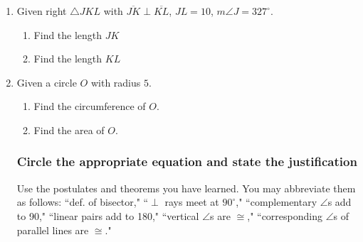 \documentclass[12pt, twoside]{article}
\begin{document}
\begin{enumerate}
  \item Given right $\triangle JKL$ with $\overline{JK} \perp \overline{KL}$, $JL=10$, $m\angle J=327^\circ$.
    \begin{center}
       \vspace{1cm}
    \end{center}
    \begin{enumerate}
      \item Find the length $JK$\\[2cm]
      \item Find the length $KL$\\[2cm]
    \end{enumerate}

  \item Given a circle $O$ with radius $5$.
  \begin{enumerate}
    \item Find the circumference of $O$. \vspace{2cm}
    \item Find the area of $O$. \vspace{2cm}
  \end{enumerate}

\newpage
\subsubsection*{Circle the appropriate equation and state the justification}
Use the postulates and theorems you have learned. You may abbreviate them as follows: ``def. of bisector," ``$\perp$ rays meet at $90^\circ$," ``complementary $\angle$s add to 90," ``linear pairs add to 180," ``vertical $\angle$s are $\cong$," ``corresponding $\angle$s of parallel lines are $\cong$."



\end{enumerate}
\end{document}
